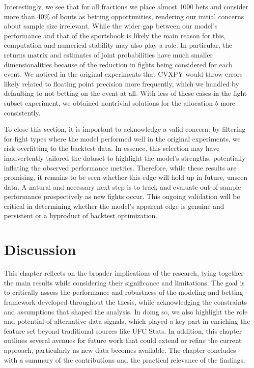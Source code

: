 \documentclass[12pt,twoside]{report}
\begin{document}
Interestingly, we see that for all fractions we place almost 1000 bets and consider more than 40\% of bouts as betting opportunities, rendering our initial concerns about sample size irrelevant. While the wider gap between our model's performance and that of the sportsbook is likely the main reason for this, computation and numerical stability may also play a role. In particular, the returns matrix and estimates of joint probabilities have much smaller dimensionalities because of the reduction in fights being considered for each event. We noticed in the original experiments that CVXPY would throw errors likely related to floating point precision more frequently, which we handled by defaulting to not betting on the event at all. With less of these cases in the fight subset experiment, we obtained nontrivial solutions for the allocation $b$ more consistently.

To close this section, it is important to acknowledge a valid concern: by filtering for fight types where the model performed well in the original experiments, we risk overfitting to the backtest data. In essence, this selection may have inadvertently tailored the dataset to highlight the model's strengths, potentially inflating the observed performance metrics. Therefore, while these results are promising, it remains to be seen whether this edge will hold up in future, unseen data. A natural and necessary next step is to track and evaluate out-of-sample performance prospectively as new fights occur. This ongoing validation will be critical in determining whether the model’s apparent edge is genuine and persistent or a byproduct of backtest optimization.



\chapter{Discussion}

This chapter reflects on the broader implications of the research, tying together the main results while considering their significance and limitations. The goal is to critically assess the performance and robustness of the modeling and betting framework developed throughout the thesis, while acknowledging the constraints and assumptions that shaped the analysis. In doing so, we also highlight the role and potential of alternative data signals, which played a key part in enriching the feature set beyond traditional sources like UFC Stats. In addition, this chapter outlines several avenues for future work that could extend or refine the current approach, particularly as new data becomes available. The chapter concludes with a summary of the contributions and the practical relevance of the findings.
\end{document}
